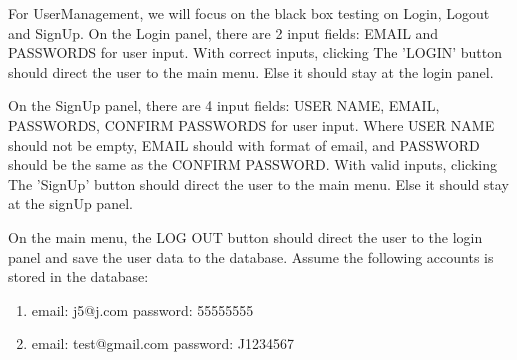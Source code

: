 \documentclass[11pt]{article}
\begin{document}
    For UserManagement, we will focus on the black box testing on Login, Logout and SignUp.
    On the Login panel, there are 2 input fields: EMAIL and PASSWORDS for user input.
    With correct inputs, clicking The 'LOGIN' button should direct the user to the main menu. Else it should stay at the login panel.

    On the SignUp panel, there are 4 input fields: USER NAME, EMAIL, PASSWORDS, CONFIRM PASSWORDS for user input.
    Where USER NAME should not be empty, EMAIL should with format of email, and PASSWORD should be the same as the CONFIRM PASSWORD.
    With valid inputs, clicking The 'SignUp' button should direct the user to the main menu. Else it should stay at the signUp panel.

    On the main menu, the LOG OUT button should direct the user to the login panel and save the user data to the database.
    Assume the following accounts is stored in the database:
    \begin{enumerate}
        \item email: j5@j.com password: 55555555
        \item email: test@gmail.com password: J1234567
    \end{enumerate}
\end{document}
